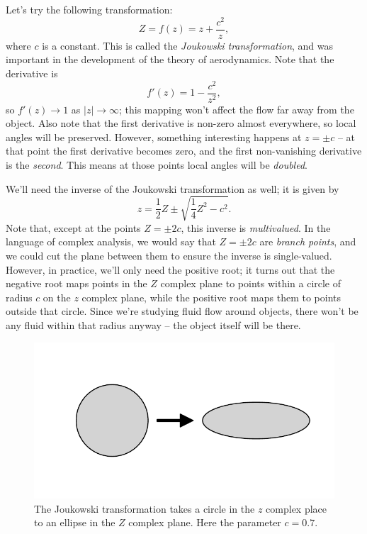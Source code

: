 Let's try the following transformation:
\begin{equation}
Z = f(z) = z + \frac{c^2}{z},
\end{equation}
where $c$ is a constant.  This is called the \emph{Joukowski transformation}, and was important in the development of the theory of aerodynamics.  Note that the derivative is
\[
f'(z) = 1 - \frac{c^2}{z^2},
\]
so $f'(z) \to 1$ as $|z| \to \infty$; this mapping won't affect the flow far away from the object.  Also note that the first derivative is non-zero almost everywhere, so local angles will be preserved.  However, something interesting happens at $z = \pm c$ -- at that point the first derivative becomes zero, and the first non-vanishing derivative is the \emph{second}.  This means at those points local angles will be \emph{doubled}.

We'll need the inverse of the Joukowski transformation as well; it is given by
\begin{equation}
\label{eq_inverse_jt}
z = \frac{1}{2}Z \pm \sqrt{\frac{1}{4} Z^2 - c^2}.
\end{equation}
Note that, except at the points $Z = \pm 2c$, this inverse is \emph{multivalued}.  In the language of complex analysis, we would say that $Z = \pm 2c$ are \emph{branch points}, and we could cut the plane between them to ensure the inverse is single-valued.  However, in practice, we'll only need the positive root; it turns out that the negative root maps points in the $Z$ complex plane to points within a circle of radius $c$ on the $z$ complex plane, while the positive root maps them to points outside that circle.  Since we're studying fluid flow around objects, there won't be any fluid within that radius anyway -- the object itself will be there.

\begin{figure}
\centering\includegraphics[width=0.75\linewidth]{Figures/Chapter4/fig_jt_ellipse}
\caption{The Joukowski transformation takes a circle in the $z$ complex place to an ellipse in the $Z$ complex plane.  Here the parameter $c = 0.7$.}
\label{fig_jt_ellipse}
\end{figure}

